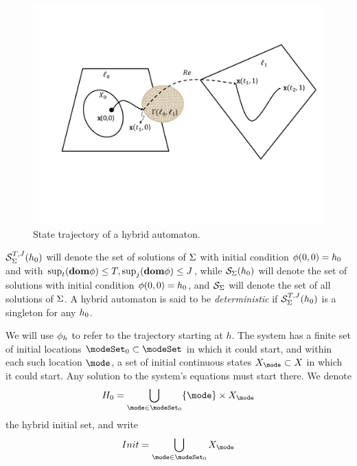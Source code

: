 \begin{figure}[tb]
	\centering
	\includegraphics[scale=0.3]{figures/HA.pdf}
	\caption{State trajectory of a hybrid automaton.}
	\label{fig:HA}
\end{figure}

\begin{defn}
	\label{def:solutionsets}
	$\mathcal{S}_\Sigma^{T,J}(h_0)$ will denote the set of solutions of $\Sigma$ with initial condition $\mathbf{\phi}(0,0) = h_0$ and with $\sup_t(\mathbf{dom} \mathbf{\phi}) \leq T, \sup_j(\mathbf{dom} \mathbf{\phi}) \leq J$,
	while $\mathcal{S}_\Sigma(h_0)$ will denote the set of solutions with initial condition $\mathbf{\phi}(0,0) = h_0$,
	and $\mathcal{S}_\Sigma$ will denote the set of all solutions of $\Sigma$.
	A hybrid automaton is said to be \emph{deterministic} if $\mathcal{S}_\Sigma^{T,J}(h_0)$ is a singleton for any $h_0$.
\end{defn}

We will use $\mathbf{\phi}_h$ to refer to the trajectory starting at $h$.
The system has a finite set of initial locations $\modeSet_0 \subset \modeSet$ in which it could start, 
and within each such location $\mode$, a set of initial continuous states $\stSet_\mode \subset \stSet$ in which it could start. 
Any solution to the system's equations must start there. We denote 
\[H_0 = \bigcup_{\mode \in \modeSet_0} \{\mode\}\times \stSet_\mode\]
the hybrid initial set, and write
\[Init = \bigcup_{\mode \in \modeSet_0}\stSet_\mode \]

